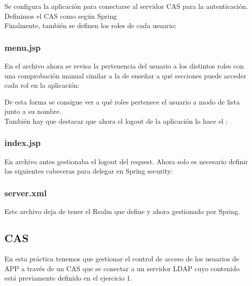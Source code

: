 \documentclass[10pt,a4paper]{article}
\begin{document}
Se configura la aplicación para conectarse al servidor CAS para la autenticación. Definimos el CAS como  según Spring\\


Finalmente, también se definen los roles de cada usuario:



\subsubsection*{menu.jsp}
En el archivo  ahora se revisa la pertenencia del usuario a los distintos roles con una comprobación manual similar a la de enseñar a qué secciones puede acceder cada rol en la aplicación:


De esta forma se consigue ver a qué roles pertenece el usuario a modo de lista junto a su nombre.\\

También hay que destacar que ahora el logout de la aplicación lo hace el :



\subsubsection*{index.jsp}
En archivo  antes gestionaba el logout del request. Ahora solo es necesario definir las siguientes cabeceras para delegar en Spring security:


\subsubsection*{server.xml}
Este archivo deja de tener el Realm que define  y  ahora gestionado por Spring.

\subsection*{CAS}
En esta práctica tenemos que gestionar el control de acceso de los usuarios de APP a través de un CAS que se conectar a un servidor LDAP cuyo contenido está previamente definido en el ejercicio 1. \\
\end{document}
